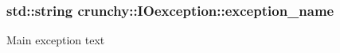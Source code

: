 \subsubsection[{exception\+\_\+name}]{\setlength{\rightskip}{0pt plus 5cm}std\+::string crunchy\+::\+I\+Oexception\+::exception\+\_\+name}\hypertarget{namespacecrunchy_1_1_i_oexception_a2c496a33c84b131ad1b2a7541f9a694c}{}\label{namespacecrunchy_1_1_i_oexception_a2c496a33c84b131ad1b2a7541f9a694c}
Main exception text 
